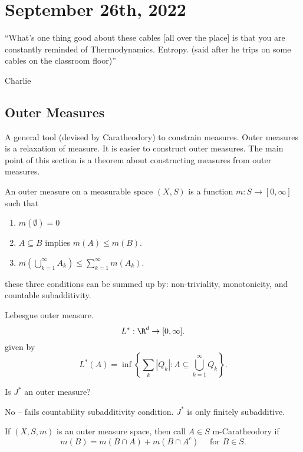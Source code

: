 \section{September 26th, 2022}

\epigraph{``What's one thing good about these cables [all over the place] is that you are constantly reminded
	of Thermodynamics. Entropy. (said after he trips on some cables on the classroom floor)''}{Charlie}

\subsection{Outer Measures}
A general tool (devised by Caratheodory) to constrain measures. Outer measures is a relaxation of measure.
It is easier to construct outer measures. The main point of this section is a theorem about
constructing measures from outer measures.

\begin{definition}
	An outer measure on a measurable space $(X,S)$ is a function $m: S \to [0, \infty]$ such that
	\begin{enumerate}
		\item $m(\emptyset) = 0$
		\item $A \subseteq B$ implies $m(A) \leq m(B)$.
		\item $m \left(\bigcup_{k=1}^{\infty} A_k\right) \leq \sum_{k = 1}^{\infty} m(A_k)$.
	\end{enumerate}
	these three conditions can be summed up by: non-triviality, monotonicity, and countable subadditivity.
\end{definition}

\begin{example}
  Lebesgue outer measure.
	\[
		L^* : \R^d \to [0, \infty].
	\]
	given by
	\[
		L^*(A) = \inf \left\{\sum_k \left|Q_k\right| : A \subseteq \bigcup_{k = 1}^{\infty} Q_k \right\}.
	\]
\end{example}

\begin{question}
Is $J^*$ an outer measure?
\end{question}
No -- fails countability subadditivity condition. $J^*$ is only finitely subadditive.

\begin{definition}[m-Caratheodory]
	If $(X,S,m)$ is an outer measure space, then call $A \in S$ m-Caratheodory if
	\[
		m(B) = m(B \cap A) + m(B \cap A^c) \quad \text{ for } B \in S.
	\]
\end{definition}

